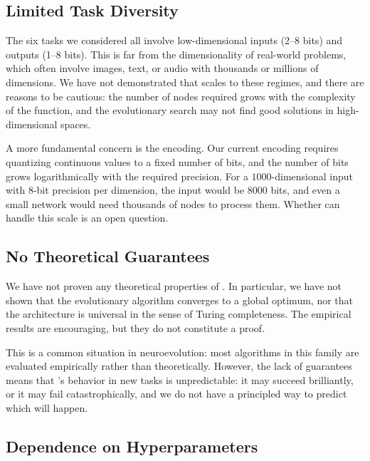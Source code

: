 \subsection{Limited Task Diversity}
\label{sec:limitation-tasks}

The six tasks we considered all involve low-dimensional inputs (2--8
bits) and outputs (1--8 bits). This is far from the dimensionality of
real-world problems, which often involve images, text, or audio with
thousands or millions of dimensions. We have not demonstrated that
\modnet{} scales to these regimes, and there are reasons to be
cautious: the number of nodes required grows with the complexity of
the function, and the evolutionary search may not find good solutions
in high-dimensional spaces.

A more fundamental concern is the encoding. Our current encoding
requires quantizing continuous values to a fixed number of bits, and
the number of bits grows logarithmically with the required precision.
For a $1000$-dimensional input with $8$-bit precision per dimension,
the input would be $8000$ bits, and even a small network would need
thousands of nodes to process them. Whether \modnet{} can handle this
scale is an open question.

\subsection{No Theoretical Guarantees}
\label{sec:limitation-theory}

We have not proven any theoretical properties of \modnet{}. In
particular, we have not shown that the evolutionary algorithm
converges to a global optimum, nor that the architecture is
universal in the sense of Turing completeness. The empirical results
are encouraging, but they do not constitute a proof.

This is a common situation in neuroevolution: most algorithms in this
family are evaluated empirically rather than theoretically. However,
the lack of guarantees means that \modnet{}'s behavior in new tasks
is unpredictable: it may succeed brilliantly, or it may fail
catastrophically, and we do not have a principled way to predict
which will happen.

\subsection{Dependence on Hyperparameters}
\label{sec:limitation-hyper}

